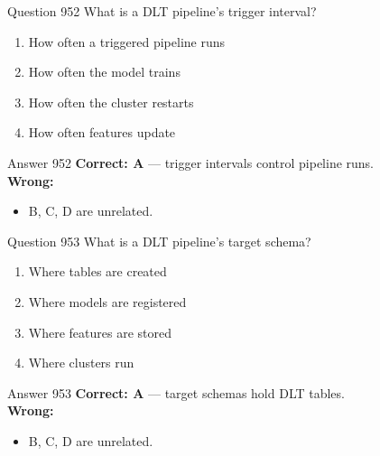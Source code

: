 \documentclass[aspectratio=169,11pt]{beamer}
\begin{document}
	\begin{frame}{Question 952}
		What is a DLT pipeline's trigger interval?
		\begin{enumerate}[label=\Alph*.]
			\item How often a triggered pipeline runs
			\item How often the model trains
			\item How often the cluster restarts
			\item How often features update
		\end{enumerate}
	\end{frame}
	\begin{frame}{Answer 952}
		\textbf{Correct: A} --- trigger intervals control pipeline runs.\\
		\vspace{0.5em}
		\textbf{Wrong:}
		\begin{itemize}
			\item B, C, D are unrelated.
		\end{itemize}
	\end{frame}
	
	\begin{frame}{Question 953}
		What is a DLT pipeline's target schema?
		\begin{enumerate}[label=\Alph*.]
			\item Where tables are created
			\item Where models are registered
			\item Where features are stored
			\item Where clusters run
		\end{enumerate}
	\end{frame}
	\begin{frame}{Answer 953}
		\textbf{Correct: A} --- target schemas hold DLT tables.\\
		\vspace{0.5em}
		\textbf{Wrong:}
		\begin{itemize}
			\item B, C, D are unrelated.
		\end{itemize}
	\end{frame}
	
\end{document}
